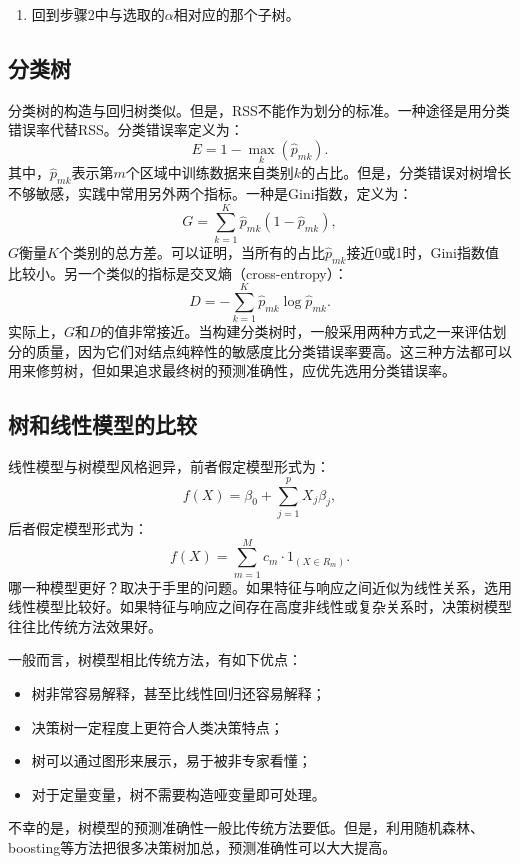 \documentclass[hyperref,]{ctexart}
\providecommand{\tightlist}{%
  \setlength{\itemsep}{0pt}\setlength{\parskip}{0pt}}
\begin{document}
\begin{enumerate}
\def\labelenumi{\arabic{enumi}.}
\setcounter{enumi}{3}
\tightlist
\item
  回到步骤2中与选取的\(\alpha\)相对应的那个子树。
\end{enumerate}

\subsection{分类树}

分类树的构造与回归树类似。但是，RSS不能作为划分的标准。一种途径是用分类错误率代替RSS。分类错误率定义为：
\[E=1-\max_k (\hat{p}_{mk}).\]
其中，\(\hat{p}_{mk}\)表示第\(m\)个区域中训练数据来自类别\(k\)的占比。但是，分类错误对树增长不够敏感，实践中常用另外两个指标。一种是Gini指数，定义为：
\[G=\sum_{k=1}^K\hat{p}_{mk}(1-\hat{p}_{mk}),\]
\(G\)衡量\(K\)个类别的总方差。可以证明，当所有的占比\(\hat{p}_{mk}\)接近0或1时，Gini指数值比较小。另一个类似的指标是交叉熵（cross-entropy）：
\[D=-\sum_{k=1}^K \hat{p}_{mk}\log \hat{p}_{mk}.\]
实际上，\(G\)和\(D\)的值非常接近。当构建分类树时，一般采用两种方式之一来评估划分的质量，因为它们对结点纯粹性的敏感度比分类错误率要高。这三种方法都可以用来修剪树，但如果追求最终树的预测准确性，应优先选用分类错误率。

\subsection{树和线性模型的比较}

线性模型与树模型风格迥异，前者假定模型形式为：
\[f(X)=\beta_0+\sum_{j=1}^p X_j\beta_j,\] 后者假定模型形式为：
\[f(X)=\sum_{m=1}^M c_m\cdot 1_{(X\in R_m)}.\]
哪一种模型更好？取决于手里的问题。如果特征与响应之间近似为线性关系，选用线性模型比较好。如果特征与响应之间存在高度非线性或复杂关系时，决策树模型往往比传统方法效果好。

一般而言，树模型相比传统方法，有如下优点：

\begin{itemize}
\tightlist
\item
  树非常容易解释，甚至比线性回归还容易解释；
\item
  决策树一定程度上更符合人类决策特点；
\item
  树可以通过图形来展示，易于被非专家看懂；
\item
  对于定量变量，树不需要构造哑变量即可处理。
\end{itemize}

不幸的是，树模型的预测准确性一般比传统方法要低。但是，利用随机森林、boosting等方法把很多决策树加总，预测准确性可以大大提高。
\end{document}
